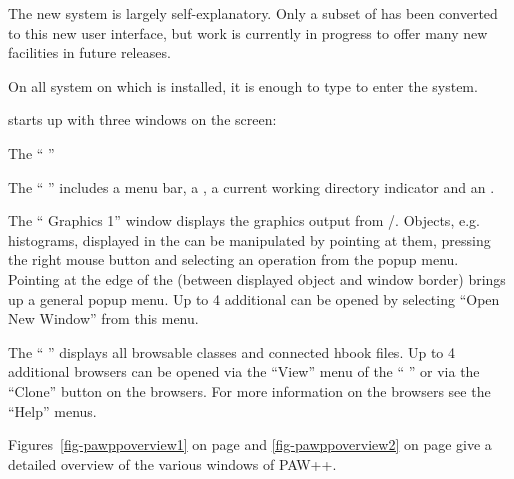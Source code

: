 The new system is largely self-explanatory. Only a subset of \XPAW{} has been
converted to this new user interface, but work is currently in progress to
offer many new facilities in future releases.

On all system on which \CERNLIB{} is installed, it is enough to type
 to enter the system.

\PAWPP{} starts up with three windows on the screen:

\begin{DL}{The ``\PAWPP{} \EW''}
\item[The ``\PAWPP{} \EW'']
   includes a menu bar, a \TP, a current working directory indicator and an \IP.

\item[The ``\PAWPP{} Graphics 1'']
   window displays the graphics output from \HIGZ/\Xxi.
   Objects, e.g. histograms, displayed in the \GW{} can be
   manipulated by pointing at them, pressing the right mouse button and
   selecting an operation from the popup menu. Pointing at the edge of the
   \GW{} (between displayed object and window border) brings up a
   general popup menu. Up to 4 additional \GW{} can be opened by
   selecting ``Open New Window'' from this menu.

\item[The ``\PAWPP{} \MB'']
   displays all browsable classes and connected
   hbook files. Up to 4 additional browsers can be opened via the ``View'' menu
   of the ``\PAWPP{} \EW'' or via the ``Clone'' button on the
   browsers. For more information on the browsers see the ``Help'' menus.
\end{DL}


Figures~\ref{fig-pawppoverview1} on page \pageref{fig-pawppoverview1}
and \ref{fig-pawppoverview2} on page \pageref{fig-pawppoverview2} give
a detailed overview of the various windows of PAW++.

